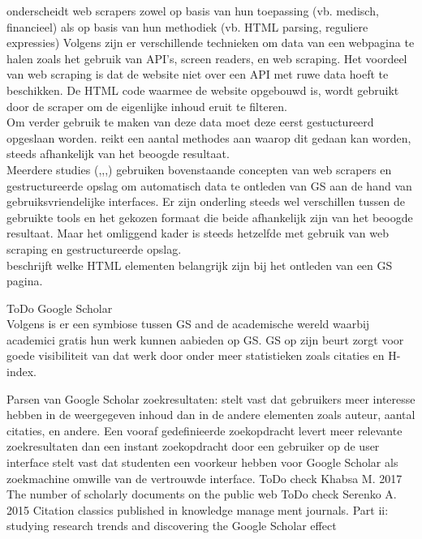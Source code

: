 \textcite{Lotfi2021} onderscheidt web scrapers zowel op basis van hun toepassing (vb. medisch, financieel) als op basis van hun  methodiek (vb. HTML parsing, reguliere expressies)
Volgens \textcite{Gray2012} zijn er verschillende technieken om data van een webpagina te halen zoals het gebruik van API's, screen readers, en web scraping. Het voordeel van web scraping is dat de website niet over een API met ruwe data hoeft te beschikken. De HTML code waarmee de website opgebouwd is, wordt gebruikt door de scraper om de eigenlijke inhoud eruit te filteren.\\
Om verder gebruik te maken van deze data moet deze eerst gestuctureerd opgeslaan worden. \textcite{Mitchell2015} reikt een aantal methodes aan waarop dit gedaan kan worden, steeds afhankelijk van het beoogde resultaat.\\
Meerdere studies (\autocite{Pratiba2018},\autocite{Rafsanjani2022},\autocite{Amin2024},\autocite{Sulistya2024}) gebruiken bovenstaande concepten van web scrapers en gestructureerde opslag om automatisch data te ontleden van GS aan de hand van gebruiksvriendelijke interfaces. Er zijn onderling steeds wel verschillen tussen de gebruikte tools en het gekozen formaat die beide afhankelijk zijn van het beoogde resultaat. Maar het omliggend kader is steeds hetzelfde met gebruik van web scraping en gestructureerde opslag.\\
\textcite{Yang2017} beschrijft welke HTML elementen belangrijk zijn bij het ontleden van een GS pagina.

ToDo Google Scholar\\
Volgens \autocite{Oh2019} is er een symbiose tussen GS and de academische wereld waarbij academici gratis hun werk kunnen aabieden op GS. GS op zijn beurt zorgt voor goede visibiliteit van dat werk door onder meer statistieken zoals citaties en H-index.

Parsen van Google Scholar zoekresultaten:
\autocite{Kim2019} stelt vast dat gebruikers meer interesse hebben in de weergegeven inhoud dan in de andere elementen zoals auteur, aantal citaties, en andere.
Een vooraf gedefinieerde zoekopdracht levert meer relevante zoekresultaten dan een instant zoekopdracht door een gebruiker op de user interface \autocite{Zhang2013}
\textcite{Wu2014} stelt vast dat studenten een voorkeur hebben voor Google Scholar als zoekmachine omwille van de vertrouwde interface.
ToDo check Khabsa M. 2017 The number of scholarly documents on the public web
ToDo check Serenko A. 2015 Citation classics published in knowledge management journals. Part ii: studying research trends and discovering the Google Scholar effect

